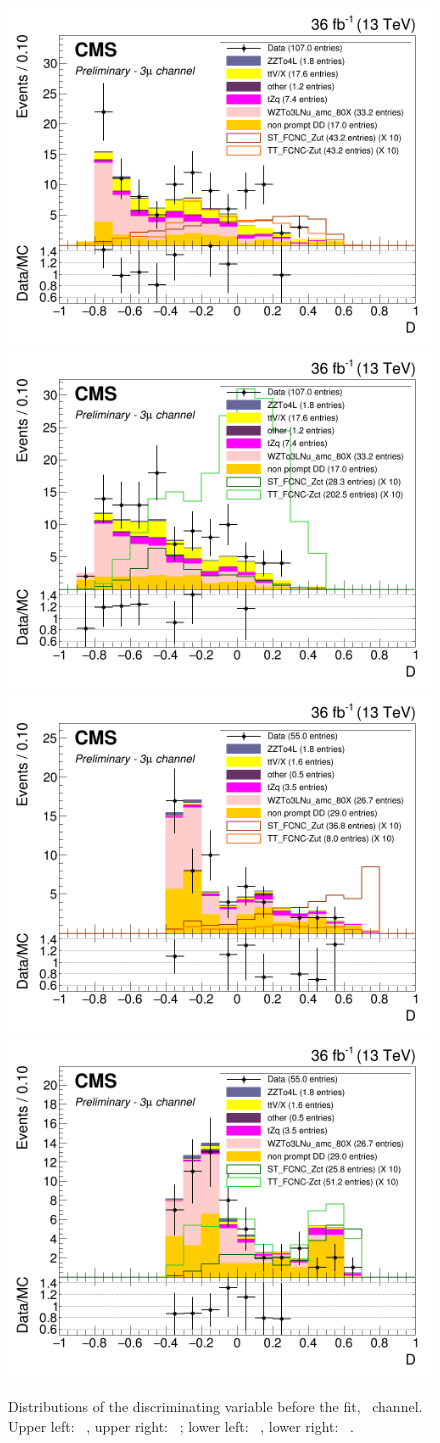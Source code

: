\begin{figure}[ht]
	\centering
	  \includegraphics[width=0.49\linewidth]{6_Search/Figures/BDTunweighted/toppair_Zut_BDT_uuu_Stack}
	  \includegraphics[width=0.49\linewidth]{6_Search/Figures/BDTunweighted/toppair_Zct_BDT_uuu_Stack}
	  \includegraphics[width=0.49\linewidth]{6_Search/Figures/BDTunweighted/singletop_Zut_BDT_uuu_Stack}
	  \includegraphics[width=0.49\linewidth]{6_Search/Figures/BDTunweighted/singletop_Zct_BDT_uuu_Stack}
	\caption{Distributions of the discriminating variable before the fit, \mumumu\  channel. Upper left: \TTSR\ \Zut , upper right: \TTSR\ \Zct ; lower left: \STSR\  \Zut , lower right: \STSR\  \Zct .}
	\label{fig:bdtuuustack}
\end{figure}


